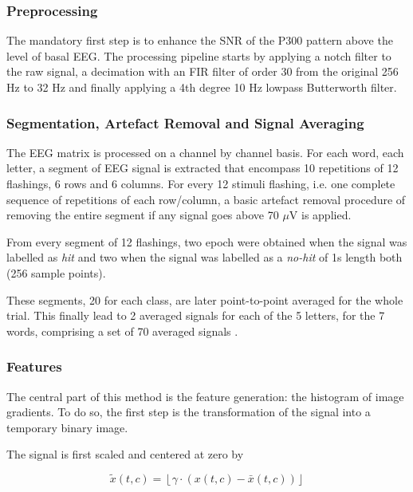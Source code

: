 \documentclass[entropy,article,submit,moreauthors,pdftex,10pt,a4paper]{mdpi}
\begin{document}
\subsubsection{Preprocessing}

The mandatory first step is to enhance the SNR of the P300 pattern above the level of basal EEG. The processing pipeline starts by applying a notch filter to the raw signal, a decimation with an FIR filter of order 30 from the original 256 Hz to 32 Hz and finally applying a 4th degree 10 Hz lowpass Butterworth filter.  

\subsubsection{Segmentation, Artefact Removal and Signal Averaging}

The EEG matrix is processed on a channel by channel basis.  For each word, each letter, a segment of EEG signal is extracted that encompass 10 repetitions of 12 flashings, 6 rows and 6 columns.  For every 12 stimuli flashing, i.e. one complete sequence of repetitions of each row/column, a basic artefact removal procedure of removing the entire segment if any signal goes above 70 $\mu$V is applied.

From every segment of 12 flashings, two epoch were obtained when the signal was labelled as \textit{hit} and two when the signal was labelled as a \textit{no-hit} of 1s length both (256 sample points).

These segments, 20 for each class, are later point-to-point averaged for the whole trial.  This finally lead to 2 averaged signals for each of the 5 letters, for the 7 words, comprising a set of 70 averaged signals \citep{Liang2008}.


\subsubsection{Features}

The central part of this method is the feature generation: the histogram of image gradients.  To do so, the first step is the transformation of the signal into a temporary binary image.

The signal is first scaled and centered at zero by 

\begin{equation}
\tilde{x}(t,c) = \left \lfloor{ \gamma \cdot ( x(t,c) - \bar{x}(t,c)  )}\right \rfloor
\end{equation}
\end{document}
